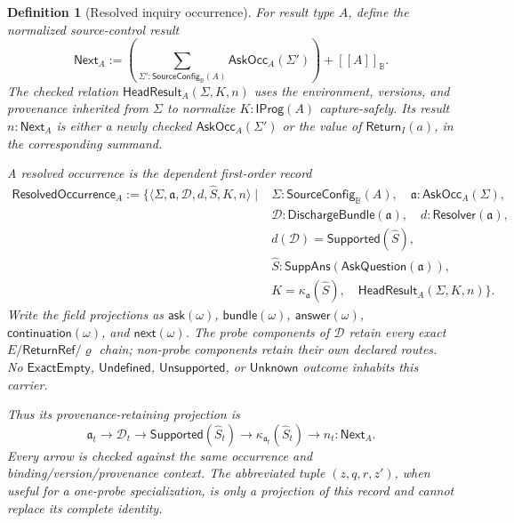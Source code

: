 \documentclass[11pt,oneside]{article}
\newtheorem{definition}{Definition}[section]
\newcommand{\B}{\mathbb B}
\newcommand{\ReturnRef}{\mathsf{ReturnRef}}
\newcommand{\AskRef}{\mathfrak a}
\newcommand{\ResPath}{\varrho}
\newcommand{\den}[1]{[\![#1]\!]}
\begin{document}
\begin{definition}[Resolved inquiry occurrence]\label{def:resolved-inquiry-occurrence}
For result type \(A\), define the normalized source-control result
\[
\boxed{
\mathsf{Next}_A
:=
\left(\sum_{\Sigma':\mathsf{SourceConfig}_{\B}(A)}\mathsf{AskOcc}_A(\Sigma')\right)
+\den{A}_{\B}.
}
\]
The checked relation \(\mathsf{HeadResult}_A(\Sigma,K,n)\) uses the environment, versions, and
provenance inherited from \(\Sigma\) to normalize \(K:\mathsf{IProg}(A)\) capture-safely.  Its
result \(n:\mathsf{Next}_A\) is either a newly checked \(\mathsf{AskOcc}_A(\Sigma')\) or the value
of \(\mathsf{Return}_I(a)\), in the corresponding summand.

A resolved occurrence is the dependent first-order record
\[
\boxed{
\begin{aligned}
\mathsf{ResolvedOccurrence}_A
:=\{\langle\Sigma,\AskRef,\mathcal D,d,\widehat S,K,n\rangle\mid{}&
 \Sigma:\mathsf{SourceConfig}_{\B}(A),\quad
 \AskRef:\mathsf{AskOcc}_A(\Sigma),\\
&\mathcal D:\mathsf{DischargeBundle}(\AskRef),\quad
 d:\mathsf{Resolver}(\AskRef),\\
&d(\mathcal D)=\mathsf{Supported}(\widehat S),\\
&\widehat S:\mathsf{SuppAns}(\mathsf{AskQuestion}(\AskRef)),\\
&K=\kappa_{\AskRef}(\widehat S),\quad
 \mathsf{HeadResult}_A(\Sigma,K,n)\}.
\end{aligned}
}
\]
Write the field projections as \(\mathsf{ask}(\omega)\), \(\mathsf{bundle}(\omega)\),
\(\mathsf{answer}(\omega)\), \(\mathsf{continuation}(\omega)\), and
\(\mathsf{next}(\omega)\).  The probe components of \(\mathcal D\) retain every exact
\(E/\ReturnRef/\ResPath\) chain; non-probe components retain their own declared routes.  No
\(\mathsf{ExactEmpty}\), \(\mathsf{Undefined}\), \(\mathsf{Unsupported}\), or
\(\mathsf{Unknown}\) outcome inhabits this carrier.

Thus its provenance-retaining projection is
\[
\AskRef_t
\longrightarrow\mathcal D_t
\longrightarrow\mathsf{Supported}(\widehat S_t)
\longrightarrow\kappa_{\AskRef_t}(\widehat S_t)
\longrightarrow n_t:\mathsf{Next}_A.
\]
Every arrow is checked against the same occurrence and binding/version/provenance context.  The
abbreviated tuple \((z,q,r,z')\), when useful for a one-probe specialization, is only a projection
of this record and cannot replace its complete identity.
\end{definition}
\end{document}
